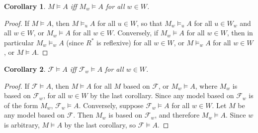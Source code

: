 \documentclass[12pt]{article}
\newtheorem{cor}{Corollary}
\begin{document}
\begin{cor} $M\models A$ iff $M_w \models A$ for all $w\in W$. \end{cor}
\begin{proof}
If $M\models A$, then $M \models_u A$ for all $u\in W$, so that $M_w \models_u A$ for all $u\in W_w$ and all $w\in W$, or $M_w \models A$ for all $w\in W$.  Conversely, if $M_w \models A$ for all $w\in W$, then in particular $M_w \models_w A$ (since $R^*$ is reflexive) for all $w\in W$, or $M \models_w A$ for all $w\in W$, or $M \models A$.
\end{proof}

\begin{cor} $\mathcal{F} \models A$ iff $\mathcal{F}_w \models A$ for all $w\in W$. \end{cor}
\begin{proof}
If $\mathcal{F} \models A$, then $M \models A$ for all $M$ based on $\mathcal{F}$, or $M_w \models A$, where $M_w$ is based on $\mathcal{F}_w$, for all $w\in W$ by the last corollary.  Since any model based on $\mathcal{F}_w$ is of the form $M_w$, $\mathcal{F}_w \models A$.  Conversely, suppose $\mathcal{F}_w \models A$ for all $w\in W$.  Let $M$ be any model based on $\mathcal{F}$.  Then $M_w$ is based on $\mathcal{F}_w$, and therefore $M_w \models A$.  Since $w$ is arbitrary, $M\models A$ by the last corollary, so $\mathcal{F} \models A$.
\end{proof}

\end{document}
